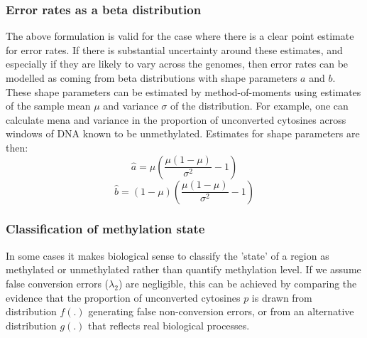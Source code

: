\documentclass[12pt,longbibliography]{article}
\begin{document}
\subsubsection{Error rates as a beta distribution} \label{sec:mean-as-beta}

The above formulation is valid for the case where there is a clear point estimate for error rates.
If there is substantial uncertainty around these estimates, and especially if they are likely to vary across the genomes, then error rates can be modelled as coming from beta distributions with shape parameters $a$ and $b$.
These shape parameters can be estimated by method-of-moments using estimates of the sample mean $\mu$ and variance $\sigma$ of the distribution.
For example, one can calculate mena and variance in the proportion of unconverted cytosines across windows of DNA known to be unmethylated.
Estimates for shape parameters are then:
\begin{equation}
    \hat{a} = \mu(\frac{\mu(1-\mu)}{\sigma^2}-1)
    \label{eqn:beta-a}
\end{equation}
\begin{equation}
    \hat{b} = (1-\mu)(\frac{\mu(1-\mu)}{\sigma^2}-1) 
    \label{eqn:beta-b}
\end{equation}

\subsubsection{Classification of methylation state} \label{sec:meth-state}

In some cases it makes biological sense to classify the 'state' of a region as methylated or unmethylated rather than quantify methylation level.
If we assume false conversion errors ($\lambda_2$) are negligible, this can be achieved by comparing the evidence that the proportion of unconverted cytosines $p$ is drawn from distribution $f(.)$ generating false non-conversion errors, or from an alternative distribution $g(.)$ that reflects real biological processes.
\end{document}
